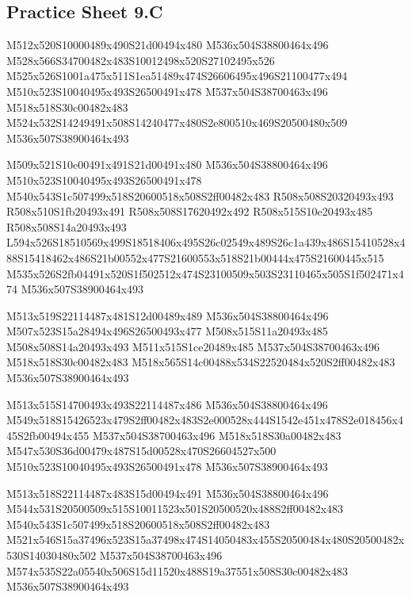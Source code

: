 \documentclass{article}
\begin{document}
\subsection{Practice Sheet 9.C}

\begin{multicols}{5}
\begin{center}

M512x520S10000489x490S21d00494x480 %
M536x504S38800464x496 %
M528x566S34700482x483S10012498x520S27102495x526 %
M525x526S1001a475x511S1ea51489x474S26606495x496S21100477x494 %
M510x523S10040495x493S26500491x478 %
M537x504S38700463x496 %
M518x518S30c00482x483 %
M524x532S14249491x508S14240477x480S2e800510x469S20500480x509 %
M536x507S38900464x493 %
\vfil
\columnbreak

M509x521S10e00491x491S21d00491x480 %
M536x504S38800464x496 %
M510x523S10040495x493S26500491x478 %
M540x543S1c507499x518S20600518x508S2ff00482x483 %
R508x508S20320493x493 %
R508x510S1fb20493x491 %
R508x508S17620492x492 %
R508x515S10e20493x485 %
R508x508S14a20493x493 %
L594x526S18510569x499S18518406x495S26c02549x489S26c1a439x486S15410528x488S15418462x486S21b00552x477S21600553x518S21b00444x475S21600445x515 %
M535x526S2fb04491x520S1f502512x474S23100509x503S23110465x505S1f502471x474 %
M536x507S38900464x493 %
\vfil
\columnbreak

M513x519S22114487x481S12d00489x489 %
M536x504S38800464x496 %
M507x523S15a28494x496S26500493x477 %
M508x515S11a20493x485 %
M508x508S14a20493x493 %
M511x515S1ce20489x485 %
M537x504S38700463x496 %
M518x518S30c00482x483 %
M518x565S14c00488x534S22520484x520S2ff00482x483 %
M536x507S38900464x493 %
\vfil
\columnbreak

M513x515S14700493x493S22114487x486 %
M536x504S38800464x496 %
M549x518S15426523x479S2ff00482x483S2e000528x444S1542e451x478S2e018456x445S2fb00494x455 %
M537x504S38700463x496 %
M518x518S30a00482x483 %
M547x530S36d00479x487S15d00528x470S26604527x500 %
M510x523S10040495x493S26500491x478 %
M536x507S38900464x493 %
\vfil
\columnbreak

M513x518S22114487x483S15d00494x491 %
M536x504S38800464x496 %
M544x531S20500509x515S10011523x501S20500520x488S2ff00482x483 %
M540x543S1c507499x518S20600518x508S2ff00482x483 %
M521x546S15a37496x523S15a37498x474S14050483x455S20500484x480S20500482x530S14030480x502 %
M537x504S38700463x496 %
M574x535S22a05540x506S15d11520x488S19a37551x508S30c00482x483 %
M536x507S38900464x493 %
\vfil

\end{center}
\end{multicols}
\end{document}
